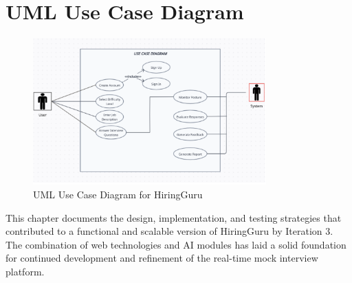 \section{UML Use Case Diagram}
\begin{figure}[h]
  \centering
  \includegraphics[width=0.8\textwidth]{sections/diagrams/UseCase.png}
  \caption{UML Use Case Diagram for HiringGuru}
  \label{fig:use-case}
\end{figure}

This chapter documents the design, implementation, and testing strategies that contributed to a functional and scalable version of HiringGuru by Iteration 3. The combination of web technologies and AI modules has laid a solid foundation for continued development and refinement of the real-time mock interview platform.

